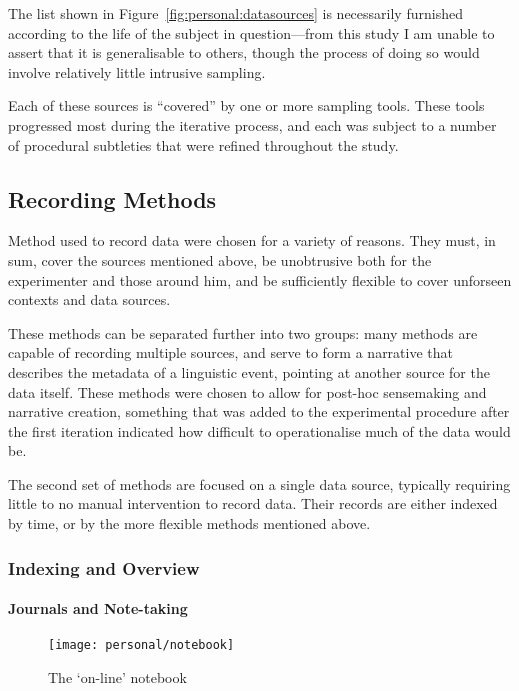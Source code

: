 The list shown in Figure~\ref{fig:personal:datasources} is necessarily furnished according to the life of the subject in question---from this study I am unable to assert that it is generalisable to others, though the process of doing so would involve relatively little intrusive sampling.

Each of these sources is ``covered'' by one or more sampling tools.  These tools progressed most during the iterative process, and each was subject to a number of procedural subtleties that were refined throughout the study.










\subsection{Recording Methods}
Method used to record data were chosen for a variety of reasons.  They must, in sum, cover the sources mentioned above, be unobtrusive both for the experimenter and those around him, and be sufficiently flexible to cover unforseen contexts and data sources.

These methods can be separated further into two groups: many methods are capable of recording multiple sources, and serve to form a narrative that describes the metadata of a linguistic event, pointing at another source for the data itself.  These methods were chosen to allow for post-hoc sensemaking and narrative creation, something that was added to the experimental procedure after the first iteration indicated how difficult to operationalise much of the data would be.

The second set of methods are focused on a single data source, typically requiring little to no manual intervention to record data.  Their records are either indexed by time, or by the more flexible methods mentioned above.


\subsubsection{Indexing and Overview}
\paragraph{Journals and Note-taking}

\begin{figure}[p]
    \centering
    \texttt{[image: personal/notebook]}
    \caption{The `on-line' notebook}
    \label{fig:personal:online_notebook}
\end{figure}

